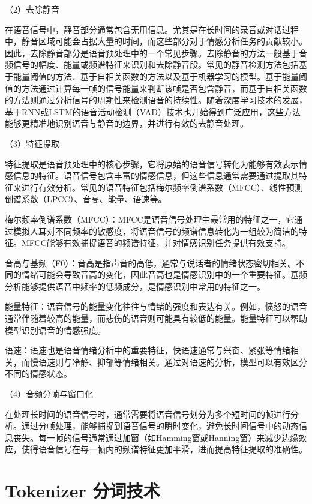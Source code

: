 （2）去除静音

在语音信号中，静音部分通常包含无用信息。尤其是在长时间的录音或对话过程中，静音区域可能会占据大量的时间，而这些部分对于情感分析任务的贡献较小。因此，去除静音部分是语音预处理中的一个常见步骤。去除静音的方法一般基于音频信号的幅度、能量或频谱特征来识别和去除静音段。常见的静音检测方法包括基于能量阈值的方法、基于自相关函数的方法以及基于机器学习的模型。基于能量阈值的方法通过计算每一帧的信号能量来判断该帧是否包含静音，而基于自相关函数的方法则通过分析信号的周期性来检测语音的持续性。随着深度学习技术的发展，基于RNN或LSTM的语音活动检测（VAD）技术也开始得到广泛应用，这些方法能够更精准地识别语音与静音的边界，并进行有效的去静音处理。

（3）特征提取

特征提取是语音预处理中的核心步骤，它将原始的语音信号转化为能够有效表示情感信息的特征。语音信号包含丰富的情感信息，但这些信息通常需要通过提取其特征来进行有效分析。常见的语音特征包括梅尔频率倒谱系数（MFCC）、线性预测倒谱系数（LPCC）、音高、能量、语速等。

梅尔频率倒谱系数（MFCC）：MFCC是语音信号处理中最常用的特征之一，它通过模拟人耳对不同频率的敏感度，将语音信号的频谱信息转化为一组较为简洁的特征。MFCC能够有效捕捉语音的频谱特征，并对情感识别任务提供有效支持。

音高与基频（F0）：音高是指声音的高低，通常与说话者的情绪状态密切相关。不同的情绪可能会导致音高的变化，因此音高也是情感识别中的一个重要特征。基频分析能够提供语音中频率的低频成分，是情感识别中常用的特征之一。

能量特征：语音信号的能量变化往往与情绪的强度和表达有关。例如，愤怒的语音通常伴随着较高的能量，而悲伤的语音则可能具有较低的能量。能量特征可以帮助模型识别语音的情感强度。

语速：语速也是语音情绪分析中的重要特征，快语速通常与兴奋、紧张等情绪相关，而慢语速则与冷静、抑郁等情绪相关。通过对语速的分析，模型可以有效区分不同的情感状态。

（4）音频分帧与窗口化

在处理长时间的语音信号时，通常需要将语音信号划分为多个短时间的帧进行分析。通过分帧处理，能够捕捉到语音信号的瞬时变化，避免长时间信号中的动态信息丧失。每一帧的信号通常通过加窗（如Hamming窗或Hanning窗）来减少边缘效应，使得语音信号在每一帧内的频谱特征更加平滑，进而提高特征提取的准确性。

\section{Tokenizer 分词技术}


